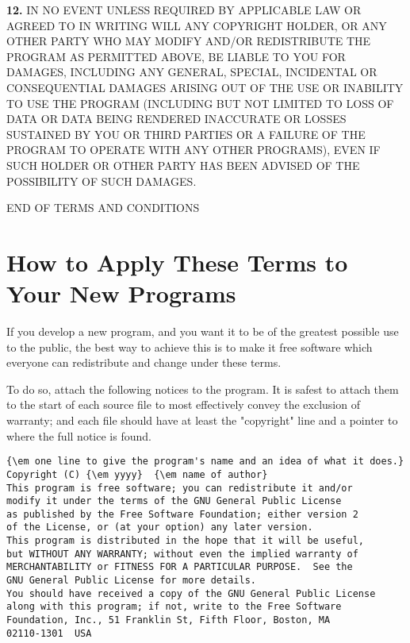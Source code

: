 {\bf 12.} IN NO EVENT UNLESS REQUIRED BY APPLICABLE LAW OR AGREED TO IN
WRITING WILL ANY COPYRIGHT HOLDER, OR ANY OTHER PARTY WHO MAY MODIFY AND/OR
REDISTRIBUTE THE PROGRAM AS PERMITTED ABOVE, BE LIABLE TO YOU FOR DAMAGES,
INCLUDING ANY GENERAL, SPECIAL, INCIDENTAL OR CONSEQUENTIAL DAMAGES ARISING
OUT OF THE USE OR INABILITY TO USE THE PROGRAM (INCLUDING BUT NOT LIMITED TO
LOSS OF DATA OR DATA BEING RENDERED INACCURATE OR LOSSES SUSTAINED BY YOU OR
THIRD PARTIES OR A FAILURE OF THE PROGRAM TO OPERATE WITH ANY OTHER PROGRAMS),
EVEN IF SUCH HOLDER OR OTHER PARTY HAS BEEN ADVISED OF THE POSSIBILITY OF SUCH
DAMAGES. 

END OF TERMS AND CONDITIONS 

\section{How to Apply These Terms to Your New Programs}
\label{SEC4}

If you develop a new program, and you want it to be of the greatest possible
use to the public, the best way to achieve this is to make it free software
which everyone can redistribute and change under these terms. 

To do so, attach the following notices to the program. It is safest to attach
them to the start of each source file to most effectively convey the exclusion
of warranty; and each file should have at least the "copyright" line and a
pointer to where the full notice is found. 

\footnotesize
\begin{verbatim}
{\em one line to give the program's name and an idea of what it does.}
Copyright (C) {\em yyyy}  {\em name of author}
This program is free software; you can redistribute it and/or
modify it under the terms of the GNU General Public License
as published by the Free Software Foundation; either version 2
of the License, or (at your option) any later version.
This program is distributed in the hope that it will be useful,
but WITHOUT ANY WARRANTY; without even the implied warranty of
MERCHANTABILITY or FITNESS FOR A PARTICULAR PURPOSE.  See the
GNU General Public License for more details.
You should have received a copy of the GNU General Public License
along with this program; if not, write to the Free Software
Foundation, Inc., 51 Franklin St, Fifth Floor, Boston, MA
02110-1301  USA
\end{verbatim}
\normalsize

